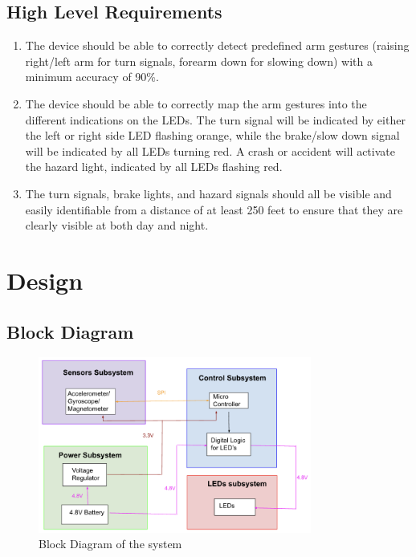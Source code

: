 \documentclass[12pt]{article}
\begin{document}
\subsection{High Level Requirements}
\begin{enumerate}
    \item The device should be able to correctly detect 
    predefined arm gestures (raising right/left arm for turn 
    signals, forearm down for slowing down) with a minimum accuracy of 90\%. 


    \item The device should be able to correctly map the arm 
    gestures into the different indications on the LEDs. The turn signal will be indicated by either the left or right side LED flashing orange, while the brake/slow down signal will be indicated by all LEDs turning red. A crash or accident will activate the hazard light, indicated by all LEDs flashing red. 

    \item The turn signals, brake lights, and hazard signals should all be visible and easily identifiable from a distance of at least 250 feet to ensure that they are clearly visible at both day and night. 


\end{enumerate}

\newpage
\section{Design}
\subsection{Block Diagram}
\begin{figure}[ht]
    \centering
    \includegraphics[width=0.8\textwidth]{block_diagram.png}
    \caption{Block Diagram of the system}
    \label{fig:my_label1}
\end{figure}
\end{document}
